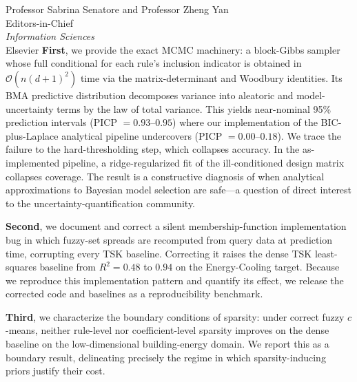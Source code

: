 \documentclass[11pt]{letter}
\begin{document}
\begin{letter}{Professor Sabrina Senatore and Professor Zheng Yan \\ Editors-in-Chief \\ \textit{Information Sciences} \\ Elsevier}
\textbf{First}, we provide the exact MCMC machinery: a block-Gibbs sampler whose full conditional for each rule's inclusion indicator is obtained in $\mathcal{O}(n(d+1)^2)$ time via the matrix-determinant and Woodbury identities.
Its BMA predictive distribution decomposes variance into aleatoric and model-uncertainty terms by the law of total variance. This yields near-nominal 95\% prediction intervals (PICP $=0.93$--$0.95$) where our implementation of the BIC-plus-Laplace analytical pipeline undercovers (PICP $=0.00$--$0.18$).
We trace the failure to the hard-thresholding step, which collapses accuracy.
In the as-implemented pipeline, a ridge-regularized fit of the ill-conditioned design matrix collapses coverage.
The result is a constructive diagnosis of when analytical approximations to Bayesian model selection are safe---a question of direct interest to the uncertainty-quantification community.

\textbf{Second}, we document and correct a silent membership-function implementation bug in which fuzzy-set spreads are recomputed from query data at prediction time, corrupting every TSK baseline. Correcting it raises the dense TSK least-squares baseline from $R^2=0.48$ to $0.94$ on the Energy-Cooling target. Because we reproduce this implementation pattern and quantify its effect, we release the corrected code and baselines as a reproducibility benchmark.

\textbf{Third}, we characterize the boundary conditions of sparsity: under correct fuzzy $c$-means, neither rule-level nor coefficient-level sparsity improves on the dense baseline on the low-dimensional building-energy domain. We report this as a boundary result, delineating precisely the regime in which sparsity-inducing priors justify their cost.


\end{letter}
\end{document}
